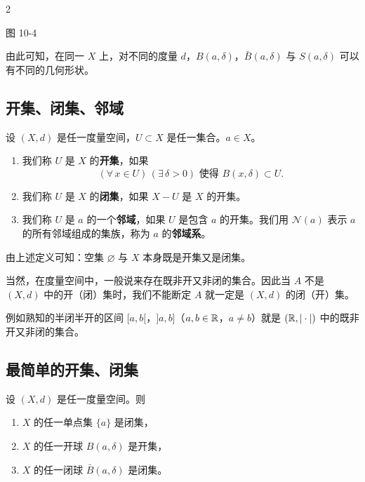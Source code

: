 \begin{sourceexample}{2}
\begin{enumerate}[label=\arabic{enumi})]
\begin{center}
图 10-4
\end{center}
\end{enumerate}

\end{sourceexample}

由此可知，在同一 $X$ 上，对不同的度量 $d$，$B(a,\delta)$，$\bar B(a,\delta)$ 与 $S(a,\delta)$ 可以有不同的几何形状。

\subsection{开集、闭集、邻域}
	\label{sec:10-2-2}

\begin{mydef*}{}

设 $(X,d)$ 是任一度量空间，$U\subset X$ 是任一集合。$a\in X$。

\begin{enumerate}[label=\arabic{enumi})]
\item 我们称 $U$ 是 $X$ 的\textbf{开集}，如果
\[(\forall\,x\in U)\,(\exists\,\delta>0)\text{ 使得 }B(x,\delta)\subset U.\]
\item 我们称 $U$ 是 $X$ 的\textbf{闭集}，如果 $X-U$ 是 $X$ 的开集。
\item 我们称 $U$ 是 $a$ 的一个\textbf{邻域}，如果 $U$ 是包含 $a$ 的开集。我们用 $\mathscr{N}(a)$ 表示 $a$ 的所有邻域组成的集族，称为 $a$ 的\textbf{邻域系}。
\end{enumerate}

\end{mydef*}

由上述定义可知：空集 $\varnothing$ 与 $X$ 本身既是开集又是闭集。

当然，在度量空间中，一般说来存在既非开又非闭的集合。因此当 $A$ 不是 $(X,d)$ 中的开（闭）集时，我们不能断定 $A$ 就一定是 $(X,d)$ 的闭（开）集。

例如熟知的半闭半开的区间 $[a,b[$，$]a,b]$（$a,b\in\mathbb{R}$，$a\neq b$）就是 $(\mathbb{R},|\cdot|)$ 中的既非开又非闭的集合。

\subsection*{最简单的开集、闭集}

\begin{myprop*}{}

设 $(X,d)$ 是任一度量空间。则
\begin{enumerate}[label=\arabic{enumi})]
\item $X$ 的任一单点集 $\{a\}$ 是闭集，
\item $X$ 的任一开球 $B(a,\delta)$ 是开集，
\item $X$ 的任一闭球 $\bar B(a,\delta)$ 是闭集。
\end{enumerate}

\end{myprop*}

